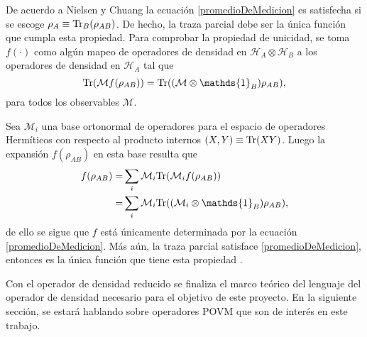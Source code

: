 De acuerdo a Nielsen y Chuang {\cite{nielsen_chuang_2010}} la ecuación {\ref{promedioDeMedicion}} es satisfecha si se escoge $\rho_A\equiv {\rm Tr}_B(\rho _{AB})$. De hecho, la traza parcial debe ser la única función que cumpla esta propiedad. Para comprobar la propiedad de unicidad, se toma  $f(\cdot)$ como algún mapeo de operadores de densidad en $\mathcal{H}_A\otimes \mathcal{H}_B$ a los operadores de densidad en $\mathcal{H}_A$ tal que \[\tr(\mathcal{M} f(\rho_{AB} )) = \tr((\mathcal{M}\otimes \mathds{1}_B )\rho_{AB} ),\] para todos los observables $\mathcal{M}$. 

Sea $\mathcal{M}_i$ una base ortonormal de operadores para el espacio de operadores Hermíticos con respecto al producto internos $(X,Y) \equiv {\rm Tr}(XY )$. Luego la expansión $f (\rho_{AB} )$ en esta base resulta que\[\begin{split}
	f(\rho_{AB})=&\sum_{i}\mathcal{M}_i\tr(\mathcal{M}_i f(\rho_{AB}))\\
	=&\sum_{i}\mathcal{M}_i \tr((\mathcal{M}_i\otimes \mathds{1}_B)\rho_{AB}),\\
\end{split}\] de ello se sigue que $f$ está únicamente determinada por la ecuación {\ref{promedioDeMedicion}}. Más aún, la traza parcial satisface {\ref{promedioDeMedicion}}, entonces es la única función que tiene esta propiedad {\cite{nielsen_chuang_2010}}.

Con el operador de densidad reducido se finaliza el marco teórico del lenguaje
del operador de densidad necesario para el objetivo de este proyecto. En la
siguiente sección, se estará hablando sobre operadores POVM que son de interés
en este trabajo.











